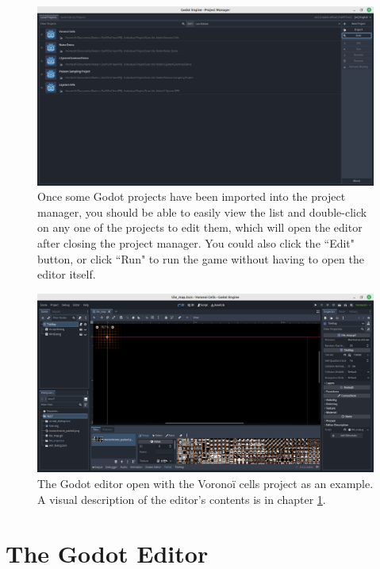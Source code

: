 \begin{figure}[H]
    \centering
    \includegraphics[width=\textwidth]{Images/projects-scanned.png}
    \caption{Once some Godot projects have been imported into the project manager, you should be able to easily view the list and double-click on any one of the projects to edit them, which will open the editor after closing the project manager. You could also click the ``Edit" button, or click ``Run" to run the game without having to open the editor itself.}
    \label{fig:godot3}
\end{figure}

\begin{figure}[H]
    \centering
    \includegraphics[width=\textwidth]{Images/godot-editor.png}
    \caption{The Godot editor open with the Voronoï cells project as an example. A visual description of the editor's contents is in chapter \ref{editor}.}
    \label{fig:godot4}
\end{figure}

\section{The Godot Editor} \label{editor}

